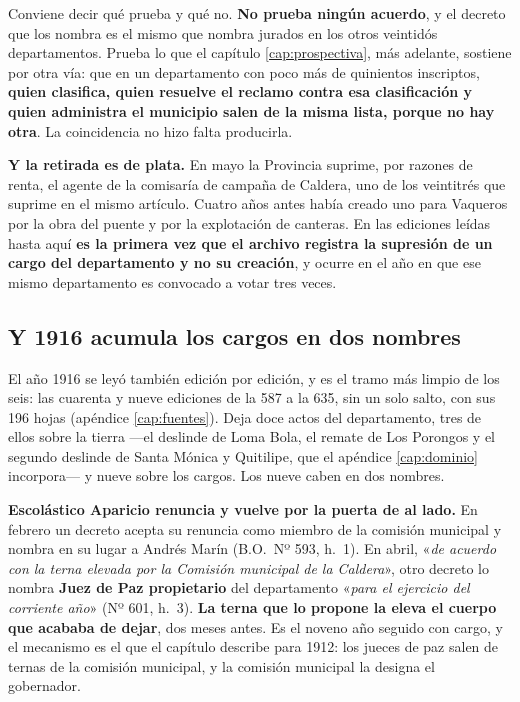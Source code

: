 \begin{cautela}
Conviene decir qué prueba y qué no. \textbf{No prueba ningún acuerdo}, y el decreto que los nombra es
el mismo que nombra jurados en los otros veintidós departamentos. Prueba lo que el capítulo
\ref{cap:prospectiva}, más adelante, sostiene por otra vía: que en un departamento con poco más de quinientos
inscriptos, \textbf{quien clasifica, quien resuelve el reclamo contra esa clasificación y quien
administra el municipio salen de la misma lista, porque no hay otra}. La coincidencia no hizo falta
producirla.
\end{cautela}

\textbf{Y la retirada es de plata.} En mayo la Provincia suprime, por razones de renta, el agente de
la comisaría de campaña de Caldera, uno de los veintitrés que suprime en el mismo artículo. Cuatro
años antes había creado uno para Vaqueros por la obra del puente y por la explotación de canteras. En
las ediciones leídas hasta aquí \textbf{es la primera vez que el archivo registra la supresión de un
cargo del departamento y no su creación}, y ocurre en el año en que ese mismo departamento es
convocado a votar tres veces.

\subsection*{Y 1916 acumula los cargos en dos nombres}

El año 1916 se leyó también edición por edición, y es el tramo más limpio de los seis: las cuarenta
y nueve ediciones de la 587 a la 635, sin un solo salto, con sus 196 hojas (apéndice
\ref{cap:fuentes}). Deja doce actos del departamento, tres de ellos sobre la tierra ---el deslinde de
Loma Bola, el remate de Los Porongos y el segundo deslinde de Santa Mónica y Quitilipe, que el
apéndice \ref{cap:dominio} incorpora--- y nueve sobre los cargos. Los nueve caben en dos nombres.

\textbf{Escolástico Aparicio renuncia y vuelve por la puerta de al
lado.} En febrero un decreto acepta su renuncia como miembro de la comisión municipal y nombra en su
lugar a Andrés Marín (B.O.\ Nº 593, h.\ 1). En abril, «\textit{de acuerdo con la terna elevada por la
Comisión municipal de la Caldera}», otro decreto lo nombra \textbf{Juez de Paz propietario} del
departamento «\textit{para el ejercicio del corriente año}» (Nº 601, h.\ 3). \textbf{La terna que lo
propone la eleva el cuerpo que acababa de dejar}, dos meses antes. Es el noveno año seguido con
cargo, y el mecanismo es el que el capítulo describe para 1912: los jueces de paz salen de ternas de
la comisión municipal, y la comisión municipal la designa el gobernador.

